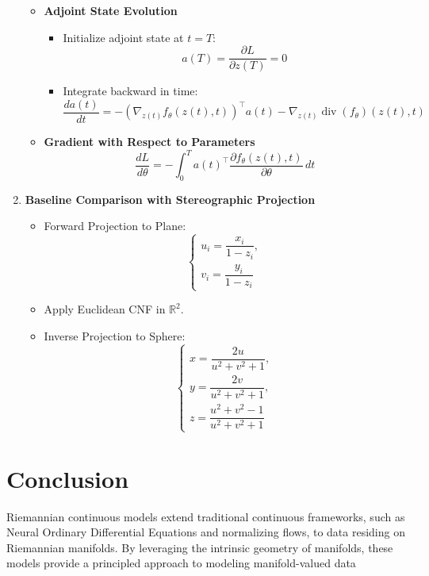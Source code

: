 \documentclass[a4paper,14pt]{article}
\theoremstyle{plain} %
\theoremstyle{definition} %
\theoremstyle{remark} %
\begin{document}
\begin{enumerate}
		\begin{itemize}
			\item \textbf{Adjoint State Evolution}
			\begin{itemize}
				\item Initialize adjoint state at \( t = T \):
				\[
				a(T) = \frac{\partial L}{\partial z(T)} = 0
				\]
				\item Integrate backward in time:
				\[
				\frac{da(t)}{dt} = - \left( \nabla_{z(t)} f_\theta(z(t), t) \right)^\top a(t) - \nabla_{z(t)} \operatorname{div}(f_\theta)(z(t), t)
				\]
			\end{itemize}
			\item \textbf{Gradient with Respect to Parameters}
			\[
			\frac{dL}{d\theta} = - \int_0^T a(t)^\top \frac{\partial f_\theta(z(t), t)}{\partial \theta} \, dt
			\]
		\end{itemize}
		
		\item \textbf{Baseline Comparison with Stereographic Projection}
			\begin{itemize}
				\item {Forward Projection to Plane}:
				\[
				\begin{cases}
					u_i = \dfrac{x_i}{1 - z_i}, \\
					v_i = \dfrac{y_i}{1 - z_i}
				\end{cases}
				\]
				\item {Apply Euclidean CNF in \(\mathbb{R}^2\)}.
				\item {Inverse Projection to Sphere}:
				\[
				\begin{cases}
					x = \dfrac{2u}{u^2 + v^2 + 1}, \\
					y = \dfrac{2v}{u^2 + v^2 + 1}, \\
					z = \dfrac{u^2 + v^2 - 1}{u^2 + v^2 + 1}
				\end{cases}
				\]
			\end{itemize}
	\end{enumerate}
	
	\section{Conclusion}
	
	Riemannian continuous models extend traditional continuous frameworks, such as Neural Ordinary Differential Equations and normalizing flows, to data residing on Riemannian manifolds. By leveraging the intrinsic geometry of manifolds, these models provide a principled approach to modeling manifold-valued data
	
	\nocite{*}
	\printbibliography
	
\end{document}

